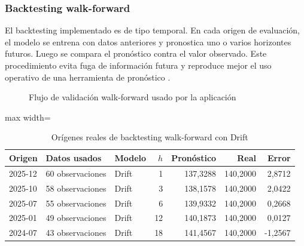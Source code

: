 \documentclass[12pt,letterpaper]{article}
\providecommand{\parencite}{\citep}
\begin{document}
\subsubsection{Backtesting walk-forward}

El backtesting implementado es de tipo temporal. En cada origen de evaluación, el modelo se entrena con datos anteriores y pronostica uno o varios horizontes futuros. Luego se compara el pronóstico contra el valor observado. Este procedimiento evita fuga de información futura y reproduce mejor el uso operativo de una herramienta de pronóstico \parencite{tashman2000}.

\begin{figure}[H]
\centering
{}
\caption{Flujo de validación walk-forward usado por la aplicación}
\label{fig:flujo_walkforward}
\end{figure}

\begin{table}[H]
\centering
\caption{Orígenes reales de backtesting walk-forward con Drift}
\label{tab:ejemplo_walkforward}
\vspace{\baselineskip}
\scriptsize
\begin{adjustbox}{max width=\textwidth}
\begin{tabular}{lllrrrr}
\toprule
\textbf{Origen} & \textbf{Datos usados} & \textbf{Modelo} & \textbf{\(h\)} & \textbf{Pronóstico} & \textbf{Real} & \textbf{Error} \\
\midrule
2025-12 & 60 observaciones & Drift & 1 & 137,3288 & 140,2000 & 2,8712 \\
2025-10 & 58 observaciones & Drift & 3 & 138,1578 & 140,2000 & 2,0422 \\
2025-07 & 55 observaciones & Drift & 6 & 139,9332 & 140,2000 & 0,2668 \\
2025-01 & 49 observaciones & Drift & 12 & 140,1873 & 140,2000 & 0,0127 \\
2024-07 & 43 observaciones & Drift & 18 & 141,4567 & 140,2000 & -1,2567 \\
\bottomrule
\end{tabular}
\end{adjustbox}
\end{table}
\end{document}
